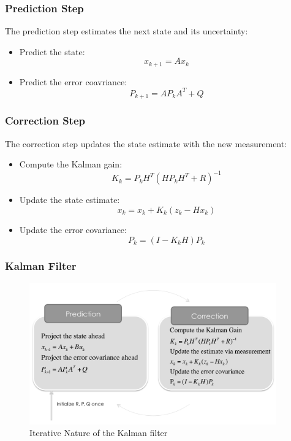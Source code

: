 \documentclass{beamer}
\begin{document}
\begin{frame}
    \frametitle{Prediction Step}
    
    The prediction step estimates the next state and its uncertainty:

    \begin{itemize}
        \item Predict the state:
        \begin{equation}
            x_{k+1}=Ax_{k} 
        \end{equation}

        \item Predict the error coavriance:
        \begin{equation}
            P_{k+1}=AP_{k}A^{T}+Q
        \end{equation}
    \end{itemize}
\end{frame}

\begin{frame}
    \frametitle{Correction Step}
    The correction step updates the state estimate with the new measurement:
    \begin{itemize}
        \item Compute the Kalman gain:
            \begin{equation}
                K_{k} = P_{k}H^{T}(HP_{k}H^{T}+R)^{-1}
            \end{equation}
        \item Update the state estimate:
            \begin{equation}
                x_{k} = x_{k}+K_{k}(z_{k}-Hx_{k})
            \end{equation}
        \item Update the error covariance:
            \begin{equation}
                P_{k} = (I-K_{k}H)P_{k}
            \end{equation}
    \end{itemize}
\end{frame}

\begin{frame}
    \frametitle{Kalman Filter}
    \begin{figure}
        \centering
        \includegraphics[width=0.95\textwidth]{images/06_kalman_diagram.png}
        \caption{Iterative Nature of the Kalman filter}
    \end{figure}
\end{frame}
\end{document}
